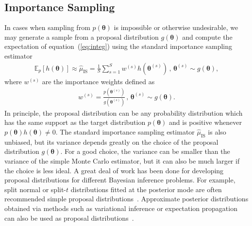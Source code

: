\documentclass[12pt]{article}
\newenvironment{nalign}{
    \begin{equation}
    \begin{aligned}
}{
    \end{aligned}
    \end{equation}
    \ignorespacesafterend
}
\begin{document}
\subsection{Importance Sampling} \label{sec:is}


In cases when sampling from $p (\boldsymbol{\theta})$ is impossible or otherwise undesirable,
we may generate a sample from a proposal distribution $g (\boldsymbol{\theta})$ and compute the expectation of equation~(\ref{eq:integ}) using the standard importance sampling estimator
\begin{nalign} \label{eq:regIS}
\mathbb{E}_p [h(\boldsymbol{\theta})] \approx \hat{\mu}_{\text{IS}} =  \frac{1}{S} \sum_{s = 1}^S w^{(s)} h (\boldsymbol{\theta}^{(s)})   \, , \, \boldsymbol{\theta}^{(s)}  \sim  g (\boldsymbol{\theta}) ,
\end{nalign}
where $w^{(s)}$ are the importance weights defined as
\begin{nalign} \label{eq:commonw}
w^{(s)} = \frac{ p (\boldsymbol{\theta}^{(s)} )}{g (\boldsymbol{\theta}^{(s)})}  \, , \, \boldsymbol{\theta}^{(s)}  \sim  g (\boldsymbol{\theta})  .
\end{nalign}
In principle, the proposal distribution can be any probability distribution which
has the same support as the target distribution $p (\boldsymbol{\theta})$
and is positive whenever $p (\boldsymbol{\theta}) h (\boldsymbol{\theta}) \neq 0$.
The standard importance sampling estimator $\hat{\mu}_{\text{IS}}$ is also unbiased, but
its variance depends greatly on the choice of the proposal distribution $g (\boldsymbol{\theta})$. For a good choice, the variance can be smaller than the variance 
of the simple Monte Carlo estimator, but it can also be much larger if the 
choice is less ideal.
A great deal of work has been done for developing
proposal distributions for different Bayesian inference problems.
For example, split normal or split-$t$ distributions fitted at the posterior mode
are often recommended simple proposal distributions~\citep{geweke1989bayesian}.
Approximate posterior distributions obtained via methods such as variational inference or expectation propagation can also be used as proposal distributions~\citep{yao2018yes}.
\end{document}
